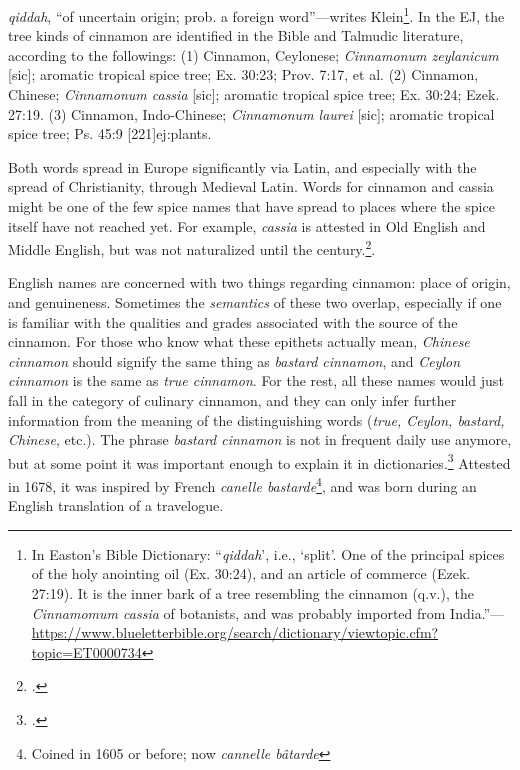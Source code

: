 \textit{qiddah}, ``of uncertain origin; prob. a foreign word''---writes Klein\footnote{In Easton's Bible Dictionary: ``\textit{qiddah}', i.e., `split'. One of the principal spices of the holy anointing oil (Ex. 30:24), and an article of commerce (Ezek. 27:19). It is the inner bark of a tree resembling the cinnamon (q.v.), the \textit{Cinnamomum cassia} of botanists, and was probably imported from India.''---\url{https://www.blueletterbible.org/search/dictionary/viewtopic.cfm?topic=ET0000734}}. 
In the \gls{EJ}, the tree kinds of cinnamon are identified in the Bible and Talmudic literature, according to the followings: (1) Cinnamon, Ceylonese; \textit{Cinnamonum zeylanicum} [sic];  aromatic tropical spice tree; Ex. 30:23; Prov. 7:17, et al. (2) Cinnamon, Chinese; \textit{Cinnamonum cassia} [sic];  aromatic tropical spice tree; Ex. 30:24; Ezek. 27:19. (3) Cinnamon, Indo-Chinese; \textit{Cinnamonum laurei} [sic]; 
aromatic tropical spice tree; Ps. 45:9 [221]{ej:plants}.

Both words spread in Europe significantly via Latin, and especially with the spread of Christianity, through Medieval Latin. Words for cinnamon and cassia \autocite[cf.][38]{musselman_dictionary_2012} might be one of the few spice names that have spread to places where the spice itself have not reached yet. For example, \textit{cassia} is attested in Old English and Middle English, but was not naturalized until the  century.\footcite[cassia]{hoad_concise_2003}.


 

English names are concerned with two things regarding cinnamon: place of origin, and genuineness. Sometimes the \emph{semantics} of these two overlap, especially if one is familiar with the qualities and grades associated with the source of the cinnamon. For those who know what these epithets actually mean, \textit{Chinese cinnamon} should signify the same thing as \textit{bastard cinnamon}, and \textit{Ceylon cinnamon} is the same as \textit{true cinnamon}. For the rest, all these names would just fall in the category of culinary cinnamon, and they can only infer further information from the meaning of the distinguishing words (\textit{true, Ceylon, bastard, Chinese}, etc.). The phrase \textit{bastard cinnamon}  is not in frequent daily use anymore, but at some point it was important enough to explain it in dictionaries.\footcite[cf.][bastard cinnamon]{oed} Attested in 1678, it was inspired by French \obs \textit{canelle bastarde}\footnote{Coined in 1605 or before; now \textit{cannelle bâtarde}}, and was born during an English translation of a travelogue. 


